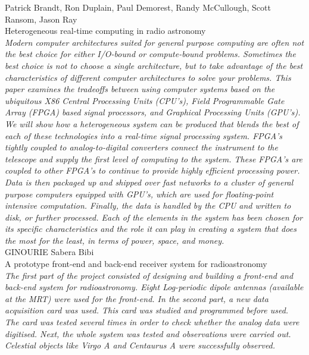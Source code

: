 \noindent
{\large Patrick Brandt, Ron Duplain,
Paul Demorest, Randy McCullough, Scott
Ransom, Jason Ray \hfill \\ Heterogeneous real-time computing in radio astronomy  }\\
 \indent \textit{Modern computer architectures suited for general purpose computing are often not the best choice for either I/O-bound or compute-bound problems. Sometimes the best choice is not to choose a single architecture, but to take advantage of the best characteristics of different computer architectures to solve your problems. This paper examines the tradeoffs between using computer systems based on the ubiquitous X86 Central Processing Units (CPU's), Field Programmable Gate Array (FPGA) based signal processors, and Graphical Processing Units (GPU's). We will show how a heterogeneous system can be produced that blends the best of each of these technologies into a real-time signal processing system. FPGA's tightly coupled to analog-to-digital converters connect the instrument to the telescope and supply the first level of computing to the system. These FPGA's are coupled to other FPGA's to continue to provide highly efficient processing power. Data is then packaged up and shipped over fast networks to a cluster of general purpose computers equipped with GPU's, which are used for floating-point intensive computation. Finally, the data is handled by the CPU and written to disk, or further processed. Each of the elements in the system has been chosen for its specific characteristics and the role it can play in creating a system that does the most for the least, in terms of power, space, and money.
}\\


\noindent
{\large GINOURIE Sabera Bibi \hfill \\ A prototype front-end and back-end receiver system for radioastronomy }\\
\indent \textit{The first part of the project consisted of designing and building a front-end and back-end system for radioastronomy. Eight Log-periodic dipole antennas (available at the MRT) were used for the front-end.
In the second part, a new data acquisition card was used. This card was studied and programmed before used. The card was tested several times in order to check whether the analog data were digitised. Next, the whole system was tested and observations were carried out. Celestial objects like Virgo A and Centaurus A were successfully observed.
}\\

